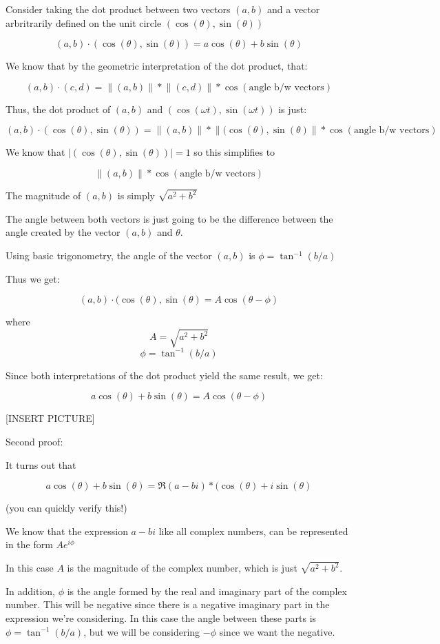 \documentclass{report}
\begin{document}
Consider taking the dot product between two vectors $(a,b)$ and a vector arbritrarily defined on the unit circle $(\cos(\theta),\sin(\theta))$

$$(a,b)\cdot(\cos(\theta),\sin(\theta)) = a\cos(\theta) + b\sin(\theta)$$

We know that by the geometric interpretation of the dot product, that:

$$(a,b)\cdot(c,d) = \lVert(a,b)\rVert*\lVert(c,d)\rVert*\cos(\text{angle b/w vectors})$$

Thus, the dot product of $(a,b)$ and $(\cos(\omega t),\sin(\omega t))$ is just:

$$(a,b)\cdot(\cos(\theta),\sin(\theta)) = \lVert(a,b)\rVert*\lVert(\cos(\theta),\sin(\theta)\rVert*\cos(\text{angle b/w vectors})$$

We know that $\lvert(\cos(\theta),\sin(\theta))\rvert =1$ so this simplifies to 

$$\lVert(a,b)\rVert*\cos(\text{angle b/w vectors})$$

The magnitude of $(a,b)$ is simply $\sqrt{a^2+b^2}$

The angle between both vectors is just going to be the difference between the angle created by the vector $(a,b)$ and $\theta$. 

Using basic trigonometry, the angle of the vector $(a,b)$ is $\phi = \tan^{-1}(b/a)$

Thus we get:

$$(a,b)\cdot(\cos(\theta),\sin(\theta) = A\cos(\theta - \phi)$$

where
$$A = \sqrt{a^2+b^2}$$
$$\phi = \tan^{-1}(b/a)$$

Since both interpretations of the dot product yield the same result, we get:

$$a\cos(\theta) + b\sin(\theta) = A\cos(\theta - \phi)$$

[INSERT PICTURE]

Second proof:

It turns out that

$$a\cos(\theta) + b\sin(\theta) = \Re{(a-bi)*(\cos(\theta) + i\sin(\theta)}$$

(you can quickly verify this!)

We know that the expression $a-bi$ like all complex numbers, can be represented in the form $Ae^{i\phi}$

In this case $A$ is the magnitude of the complex number, which is just $\sqrt{a^2+b^2}$.

In addition, $\phi$ is the angle formed by the real and imaginary part of the complex number. This will be negative since there is a negative imaginary part in the expression we're considering. In this case the angle between these parts is $\phi = \tan^{-1}(b/a)$, but we will be considering $-\phi$ since we want the negative.
\end{document}
